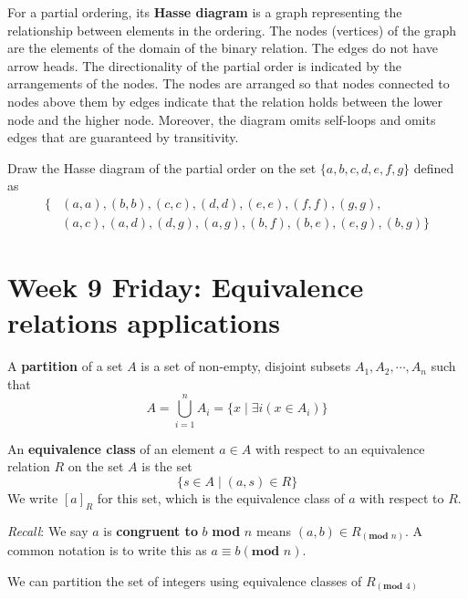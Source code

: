 \documentclass[12pt, oneside]{article}
\begin{document}
For a partial ordering, its {\bf Hasse diagram} is a graph representing the 
relationship between elements in the ordering. The nodes (vertices) of the graph 
are the elements of the 
domain of the binary relation. The edges do not have arrow heads. The
directionality of the partial order is indicated by 
the arrangements of the nodes. The nodes are arranged so that nodes connected to nodes
above them by edges indicate that the relation holds between the 
lower node and the higher node. 
Moreover, the diagram omits self-loops and 
omits edges that are guaranteed by transitivity.
 \vfill


Draw the Hasse diagram of the partial order on the set $\{a,b,c,d,e,f,g\}$ defined as
\begin{align*}
    \{  &(a,a), (b,b), (c,c), (d,d), (e,e), (f,f), (g,g), \\
        &(a,c), (a,d), (d,g), (a,g), (b,f), (b,e), (e,g), (b,g) \}
\end{align*}

\vspace{100pt}

%
 \vfill
\newpage
\section*{Week 9 Friday: Equivalence relations applications}


A {\bf partition} of a set $A$ is a set of non-empty, disjoint subsets 
$A_1, A_2, \cdots, A_n$ such that 
\[
    A = \bigcup_{i=1}^{n} A_i = \{ x \mid \exists i (x \in A_i) \}
\] 

An {\bf equivalence class} of an element $a \in A$ 
with respect to an equivalence relation $R$ on the set $A$ is the set 
\[
    \{s \in A \mid (a, s) \in R \}
\] 
We write $[a]_R$ for this set, which is the equivalence class of $a$ with respect to $R$. 

{\it Recall}: We say $a$ is {\bf congruent to} $b$ \textbf{mod} $n$ 
means $(a, b) \in R_{(\textbf{mod } n)}$. 
A common notation is to write this as $a \equiv b (\textbf{mod } n)$.

We can partition the set of integers using equivalence classes of  $R_{(\textbf{mod } 4)}$
\end{document}
